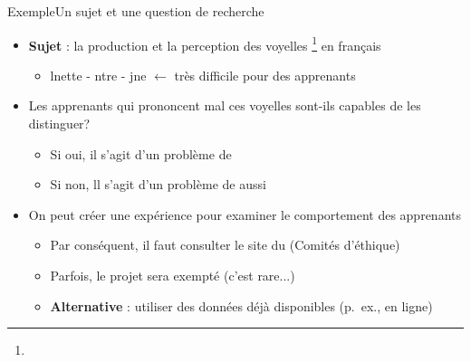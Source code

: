 \documentclass[xcolor=dvipsnames, onlymath, 10pt, aspectratio=169, handout]{beamer}
\begin{document}

\begin{frame}{Exemple}{Un sujet et une question de recherche}

	\begin{itemize}
		\item[1.] \textbf{Sujet} : la production et la perception des voyelles \footnote{} en français

		      \pause

		      \begin{itemize}
			      \item lnette - n\lav{eu}tre - jne $\leftarrow$ très difficile pour des apprenants
		      \end{itemize}

		      \pause

		\item[2.] Les apprenants qui prononcent mal ces voyelles sont-ils capables de les distinguer?%
		      \begin{itemize}
			      \item Si oui, il s'agit d'un problème de 
			      \item Si non, ll s'agit d'un problème de  aussi
		      \end{itemize}
		      \pause

		\item[3.] On peut créer une expérience pour examiner le comportement des apprenants
		      \begin{itemize}
			      \item Par conséquent, il faut consulter le site du  (Comités d'éthique)
			      \item Parfois, le projet sera exempté (c'est rare...)
			      \item \textbf{Alternative} : utiliser des données déjà disponibles (p.\ ex., en ligne)
		      \end{itemize}
	\end{itemize}

\end{frame}

\end{document}
